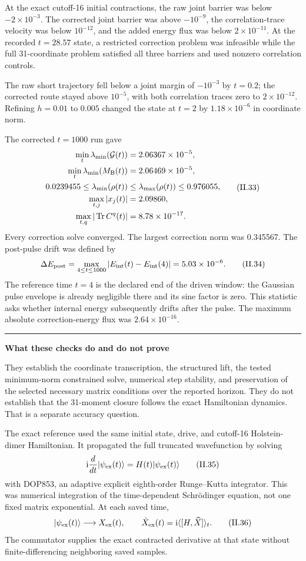 \documentclass[10pt,letterpaper,twocolumn]{article}
\newcommand{\ii}{\mathrm i}
\newcommand{\segmenthead}[1]{%
  \Needspace{5\baselineskip}%
  \par\medskip{\color{navy}\large\bfseries #1}\par
  \vspace{-2pt}{\color{navy}\rule{\columnwidth}{0.7pt}}\par\smallskip
}
\newcommand{\teachbox}[2]{%
  \par\smallskip
  \noindent\begin{minipage}{\columnwidth}
    {\color{#1}\rule{\columnwidth}{1.0pt}}\par\vspace{-1pt}
    \small\textbf{\color{#1}#2}\par\smallskip\color{black}
}
\newcommand{\closeteachbox}{%
  \par\vspace{1pt}{\color{navy!35}\rule{\columnwidth}{0.35pt}}
  \end{minipage}\par\smallskip
}
\begin{document}
At the exact cutoff-16 initial contractions, the raw joint barrier was below
\(-2\times10^{-3}\).  The corrected joint barrier was above \(-10^{-9}\),
the correlation-trace velocity was below \(10^{-12}\), and the added energy
flux was below \(2\times10^{-11}\).  At the recorded \(t=28.57\) state, a
restricted correction problem was infeasible while the full 31-coordinate
problem satisfied all three barriers and used nonzero correlation controls.

The raw short trajectory fell below a joint margin of \(-10^{-3}\) by
\(t=0.2\); the corrected route stayed above \(10^{-5}\), with both
correlation traces zero to \(2\times10^{-12}\).  Refining \(h=0.01\) to
\(0.005\) changed the state at \(t=2\) by \(1.18\times10^{-6}\) in
coordinate norm.

The corrected \(t=1000\) run gave
{\footnotesize
\[
\begin{aligned}
\min_t\lambda_{\min}(\mathcal G(t))&=2.06367\times10^{-5},\\
\min_t\lambda_{\min}(M_{\rm B}(t))&=2.06469\times10^{-5},\\
0.0239455\leq\lambda_{\min}(\rho(t))
&\leq\lambda_{\max}(\rho(t))\leq0.976055,\\
\max_{t,j}|x_j(t)|&=2.09860,\\
\max_{t,q}|\operatorname{Tr}C^q(t)|&=8.78\times10^{-17}.
\end{aligned}
\tag{II.33}
\]
}
Every correction solve converged.  The largest correction norm was
0.345567.  The post-pulse drift was defined by
\[
\Delta E_{\rm post}
=\max_{4\leq t\leq1000}
|E_{\rm int}(t)-E_{\rm int}(4)|
=5.03\times10^{-6}.
\tag{II.34}
\]
The reference time \(t=4\) is the declared end of the driven window: the
Gaussian pulse envelope is already negligible there and its sine factor is
zero.  This statistic asks whether internal energy subsequently drifts after
the pulse.  The maximum absolute correction-energy flux was
\(2.64\times10^{-16}\).

\teachbox{green}{What these checks do and do not prove}
They establish the coordinate transcription, the structured lift, the tested
minimum-norm constrained solve, numerical step stability, and preservation of
the selected necessary matrix conditions over the reported horizon.  They do
not establish that the 31-moment closure follows the exact Hamiltonian
dynamics.  That is a separate accuracy question.
\closeteachbox

\segmenthead{F. The offline exact-reference diagnostic}

The exact reference used the same initial state, drive, and cutoff-16
Holstein-dimer Hamiltonian.  It propagated the full truncated wavefunction by
solving
\[
\ii\frac{d}{dt}|\psi_{\rm ex}(t)\rangle
=H(t)|\psi_{\rm ex}(t)\rangle
\tag{II.35}
\]
with DOP853, an adaptive explicit eighth-order Runge--Kutta integrator.  This
was numerical integration of the time-dependent Schr\"odinger equation, not
one fixed matrix exponential.  At each saved time,
\[
|\psi_{\rm ex}(t)\rangle
\longrightarrow X_{\rm ex}(t),
\qquad
\dot X_{\rm ex}(t)=\ii\langle[H,\widehat X]\rangle_t.
\tag{II.36}
\]
The commutator supplies the exact contracted derivative at that state without
finite-differencing neighboring saved samples.
\end{document}
